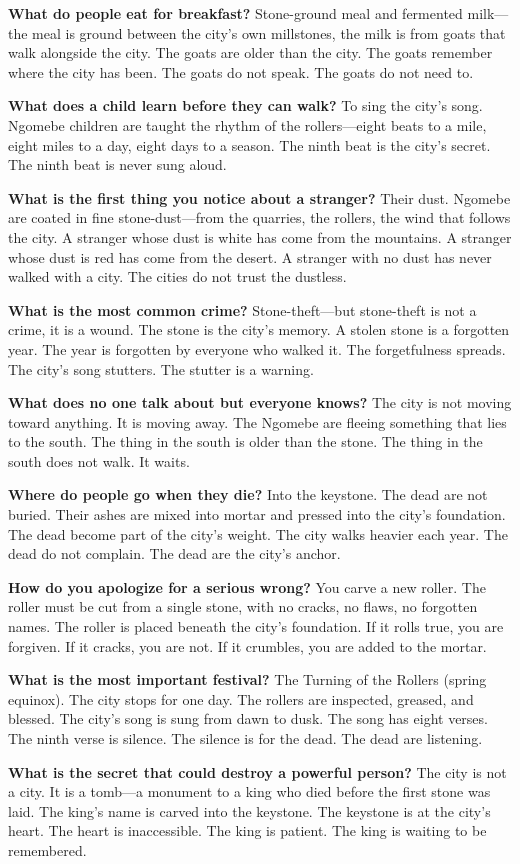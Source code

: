 \begin{almanac}
\textbf{What do people eat for breakfast?} Stone-ground meal and fermented milk---the meal is ground between the city's own millstones, the milk is from goats that walk alongside the city. The goats are older than the city. The goats remember where the city has been. The goats do not speak. The goats do not need to.

\textbf{What does a child learn before they can walk?} To sing the city's song. Ngomebe children are taught the rhythm of the rollers---eight beats to a mile, eight miles to a day, eight days to a season. The ninth beat is the city's secret. The ninth beat is never sung aloud.

\textbf{What is the first thing you notice about a stranger?} Their dust. Ngomebe are coated in fine stone-dust---from the quarries, the rollers, the wind that follows the city. A stranger whose dust is white has come from the mountains. A stranger whose dust is red has come from the desert. A stranger with no dust has never walked with a city. The cities do not trust the dustless.

\textbf{What is the most common crime?} Stone-theft---but stone-theft is not a crime, it is a wound. The stone is the city's memory. A stolen stone is a forgotten year. The year is forgotten by everyone who walked it. The forgetfulness spreads. The city's song stutters. The stutter is a warning.

\textbf{What does no one talk about but everyone knows?} The city is not moving toward anything. It is moving away. The Ngomebe are fleeing something that lies to the south. The thing in the south is older than the stone. The thing in the south does not walk. It waits.

\textbf{Where do people go when they die?} Into the keystone. The dead are not buried. Their ashes are mixed into mortar and pressed into the city's foundation. The dead become part of the city's weight. The city walks heavier each year. The dead do not complain. The dead are the city's anchor.

\textbf{How do you apologize for a serious wrong?} You carve a new roller. The roller must be cut from a single stone, with no cracks, no flaws, no forgotten names. The roller is placed beneath the city's foundation. If it rolls true, you are forgiven. If it cracks, you are not. If it crumbles, you are added to the mortar.

\textbf{What is the most important festival?} The Turning of the Rollers (spring equinox). The city stops for one day. The rollers are inspected, greased, and blessed. The city's song is sung from dawn to dusk. The song has eight verses. The ninth verse is silence. The silence is for the dead. The dead are listening.

\textbf{What is the secret that could destroy a powerful person?} The city is not a city. It is a tomb---a monument to a king who died before the first stone was laid. The king's name is carved into the keystone. The keystone is at the city's heart. The heart is inaccessible. The king is patient. The king is waiting to be remembered.
\end{almanac}

